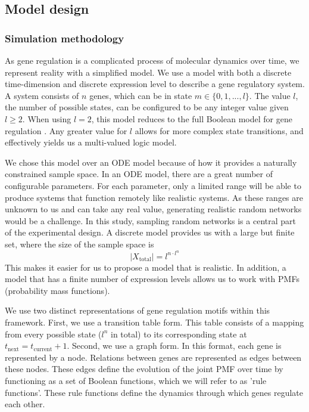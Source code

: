 \documentclass[../main.tex]{subfiles}
\begin{document}
\subsection{Model design}

\subsubsection{Simulation methodology}

As gene regulation is a complicated process of molecular dynamics over time, we represent reality with a simplified model.
We use a model with both a discrete time-dimension and discrete expression level to describe a gene regulatory system.
A system consists of $n$ genes, which can be in state $m \in \{0, 1, ..., l\}$.
The value $l$, the number of possible states, can be configured to be any integer value given $l \ge 2$.
When using $l = 2$, this model reduces to the full Boolean model for gene regulation \cite{bolouri2002modeling}.
Any greater value for $l$ allows for more complex state transitions, and effectively yields us a multi-valued logic model.

We chose this model over an ODE model because of how it provides a naturally constrained sample space.
In an ODE model, there are a great number of configurable parameters.
For each parameter, only a limited range will be able to produce systems that function remotely like realistic systems.
As these ranges are unknown to us and can take any real value, generating realistic random networks would be a challenge.
In this study, sampling random networks is a central part of the experimental design.
A discrete model provides us with a large but finite set, where the size of the sample space is
%
\begin{equation}
|X_\mathrm{total}| = l^{n \cdot l^n}
\end{equation}
%
This makes it easier for us to propose a model that is realistic.
In addition, a model that has a finite number of expression levels allows us to work with PMFs (probability mass functions).

We use two distinct representations of gene regulation motifs within this framework.
First, we use a transition table form.
This table consists of a mapping from every possible state ($l^n$ in total) to its corresponding state at $t_\mathrm{next} = t_\mathrm{current} + 1$.
Second, we use a graph form.
In this format, each gene is represented by a node.
Relations between genes are represented as edges between these nodes.
These edges define the evolution of the joint PMF over time by functioning as a set of Boolean functions, which we will refer to as 'rule functions'.
These rule functions define the dynamics through which genes regulate each other.
\end{document}
